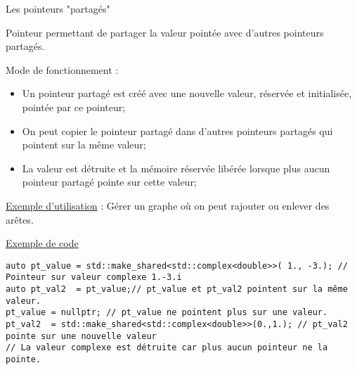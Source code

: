 \documentclass[compress,10pt,aspectratio=169]{beamer}
\begin{document}
\begin{frame}[fragile]{Les pointeurs "partagés"}
\scriptsize
  
Pointeur permettant de partager la valeur pointée avec d'autres pointeurs partagés.
  
Mode de fonctionnement :
\begin{itemize}
  \item Un pointeur partagé est créé avec une nouvelle valeur, réservée et initialisée, pointée par ce pointeur;
  \item On peut copier le pointeur partagé dans d'autres pointeurs partagés qui pointent sur la même valeur;
  \item La valeur est détruite et la mémoire réservée libérée lorsque plus aucun pointeur partagé pointe sur cette valeur;
\end{itemize}
  
\underline{Exemple d'utilisation} : Gérer un graphe où on peut rajouter ou enlever des arêtes.
  
\underline{Exemple de code}
\begin{verbatim}
auto pt_value = std::make_shared<std::complex<double>>( 1., -3.); // Pointeur sur valeur complexe 1.-3.i
auto pt_val2  = pt_value;// pt_value et pt_val2 pointent sur la même valeur.
pt_value = nullptr; // pt_value ne pointent plus sur une valeur.
pt_val2  = std::make_shared<std::complex<double>>(0.,1.); // pt_val2 pointe sur une nouvelle valeur
// La valeur complexe est détruite car plus aucun pointeur ne la pointe.
\end{verbatim}
\end{frame}
\end{document}
